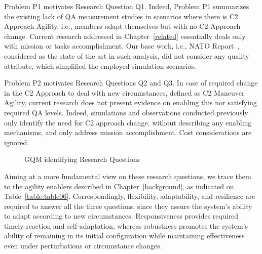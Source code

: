 Problem P1 motivates Research Question Q1. Indeed, Problem P1 summarizes the existing lack of QA measurement studies in scenarios where there is C2 Approach Agility, i.e.,  members adapt themselves but with no C2 Approach change. Current research addressed in Chapter~\ref{related} essentially deals only with mission or tasks accomplishment. Our base work, i.e., NATO Report~\cite{FRANCE2014}, considered as the state of the art in such analysis, did not consider any quality attribute, which simplified the employed simulation scenarios.

Problem P2 motivates Research Questions Q2 and Q3. In case of required change in the C2 Approach to deal with new circumstances, defined as C2 Maneuver Agility, current research does not present evidence on enabling this nor satisfying required QA levels. Indeed, simulations and observations conducted previously~\cite{FRANCE2014,Alberts2017,c2-02} only identify the need for C2 approach change, without describing any enabling mechanisms, and only address mission accomplishment. Cost considerations are ignored.

\begin{figure}[h]
\centering
\label{gqm}
\scalebox{.6}{}
\caption{GQM identifying Research Questions}
\end{figure}

Aiming at a more fundamental view on these research questions, we trace them to the agility enablers described in Chapter~\ref{background}, as indicated on Table~\ref{table:table06}. Correspondingly, flexibility, adaptability, and resilience are required to answer all the three questions, since they assure the system's ability to adapt according to new circumstances. Responsiveness provides required timely reaction and self-adaptation, whereas robustness promotes the system's ability of remaining in its initial configuration while maintaining  effectiveness even under perturbations or circumstance changes.



